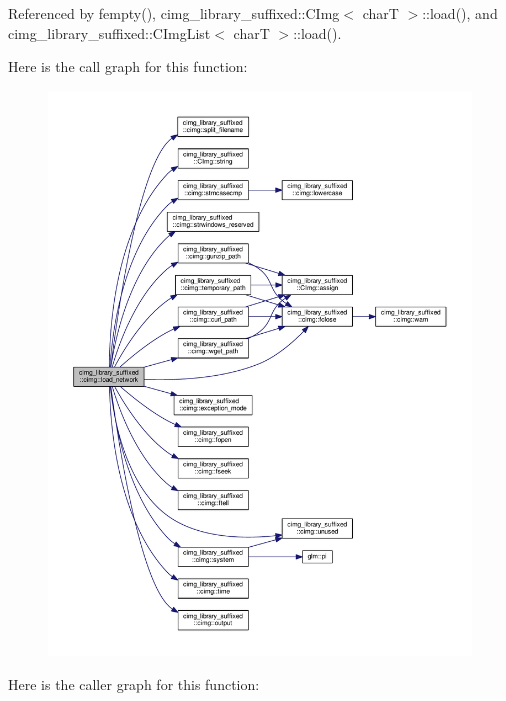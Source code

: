 Referenced by fempty(), cimg\+\_\+library\+\_\+suffixed\+::\+C\+Img$<$ char\+T $>$\+::load(), and cimg\+\_\+library\+\_\+suffixed\+::\+C\+Img\+List$<$ char\+T $>$\+::load().

Here is the call graph for this function\+:
\nopagebreak
\begin{figure}[H]
\begin{center}
\leavevmode
\includegraphics[width=350pt]{d4/d9b/namespacecimg__library__suffixed_1_1cimg_a90c05fe6fc049cba75f3a12807e97158_cgraph}
\end{center}
\end{figure}
Here is the caller graph for this function\+:
\nopagebreak
